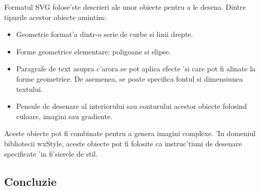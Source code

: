 \medskip

Formatul SVG folose'ste descrieri ale unor obiecte pentru a le desena. Dintre tipurile acestor obiecte amintim:
\begin{itemize}
\item Geometrie format'a dintr-o serie de curbe si linii drepte.
\item Forme geometrice elementare: poligoane si elipse.
\item Paragrafe de text asupra c'arora se pot aplica efecte 'si care pot fi alinate la forme geometrice. De asemenea, se poate specifica fontul si dimensiunea textului.
\item Pensule de desenare al interiorului sau conturului acestor obiecte folosind culoare, imagini sau gradiente.
\end{itemize}

Aceste obiecte pot fi combinate pentru a genera imagini complexe. 'In domeniul bibliotecii wxStyle, aceste obiecte pot fi folosite ca instruc'tiuni de desenare specificate 'in fi'sierele de stil.

\subsection{Concluzie}

